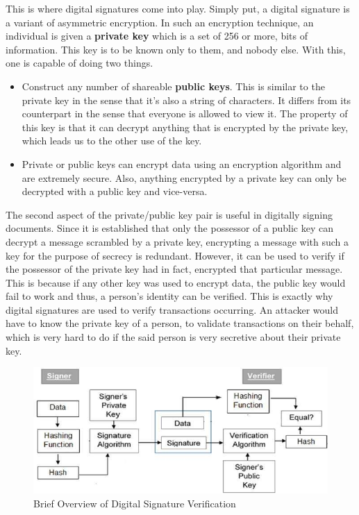 \documentclass[12pt,a4paper]{report}
\begin{document}
\begin{justify}
This is where digital signatures come into play. Simply put, a digital signature is a variant of asymmetric encryption. In such an encryption technique, an individual is given a \textbf{private key} which is a set of 256 or more, bits of information. This key is to be known only to them, and nobody else. With this, one is capable of doing two things. 
\begin{itemize}
    \item Construct any number of shareable \textbf{public keys}. This is similar to the private key in the sense that it's also a string of characters. It differs from its counterpart in the sense that everyone is allowed to view it. The property of this key is that it can decrypt anything that is encrypted by the private key, which leads us to the other use of the key.
    \item Private or public keys can encrypt data using an encryption algorithm and are extremely secure. Also, anything encrypted by a private key can only be decrypted with a public key and vice-versa.
\end{itemize}
The second aspect of the private/public key pair is useful in digitally signing documents. Since it is established that only the possessor of a public key can decrypt a message scrambled by a private key, encrypting a message with such a key for the purpose of secrecy is redundant. \newline
However, it can be used to verify if the possessor of the private key had in fact, encrypted that particular message. This is because if any other key was used to encrypt data, the public key would fail to work and thus, a person's identity can be verified.
This is exactly why digital signatures are used to verify transactions occurring.
An attacker would have to know the private key of a person, to validate transactions on their behalf, which is very hard to do if the said person is very secretive about their private key.

\begin{figure}[h]
\centering
\caption{Brief Overview of Digital Signature Verification \cite{DigitalSignature}}
\includegraphics[scale=0.6]{pics/model_digital_signature.jpg}
\end{figure}
\vspace{10mm}


\end{justify}
\end{document}
